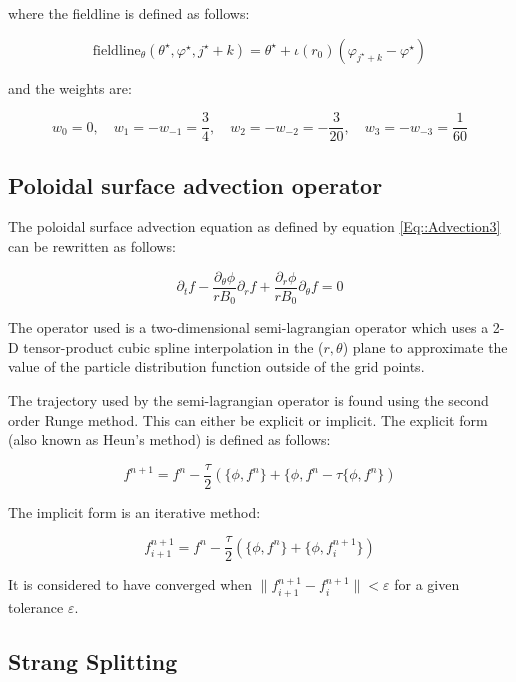 where the fieldline is defined as follows:

\begin{equation}
 \text{fieldline}_\theta(\theta^\star,\varphi^\star,j^\star+k)=\theta^\star + \iota(r_0)\left(\varphi_{j^\star+k}-\varphi^\star\right)
\end{equation}

and the weights are:

$$w_0=0,\quad w_1=-w_{-1}=\frac{3}{4},\quad w_2=-w_{-2}=-\frac{3}{20},\quad w_3=-w_{-3}=\frac{1}{60}$$

\subsection{Poloidal surface advection operator}\label{Poloidal operator}

The poloidal surface advection equation as defined by equation \ref{Eq::Advection3} can be rewritten as follows:

\begin{equation}\label{Eq::Poloidal operator}
 \partial_t f -\frac{\partial_\theta\phi}{rB_0}\partial_r f + \frac{\partial_r\phi}{rB_0}\partial_\theta f = 0
\end{equation}

The operator used is a two-dimensional semi-lagrangian operator which uses a 2-D tensor-product cubic spline interpolation in the ($r,\theta$) plane to approximate the value of the particle distribution function outside of the grid points.

The trajectory used by the semi-lagrangian operator is found using the second order Runge method. This can either be explicit or implicit. The explicit form (also known as Heun's method) is defined as follows:

\begin{equation}
 f^{n+1}=f^{n}-\frac{\tau}{2}\left(\{\phi,f^{n}\}+\{\phi,f^{n}-\tau\{\phi,f^{n}\}\right)
\end{equation}

The implicit form is an iterative method:

\begin{equation}
 f^{n+1}_{i+1}=f^{n}-\frac{\tau}{2}\left(\{\phi,f^{n}\}+\{\phi,f^{n+1}_{i}\}\right)
\end{equation}

It is considered to have converged when $\|f^{n+1}_{i+1}-f^{n+1}_{i}\|<\varepsilon$ for a given tolerance $\varepsilon$.

\subsection{Strang Splitting}

